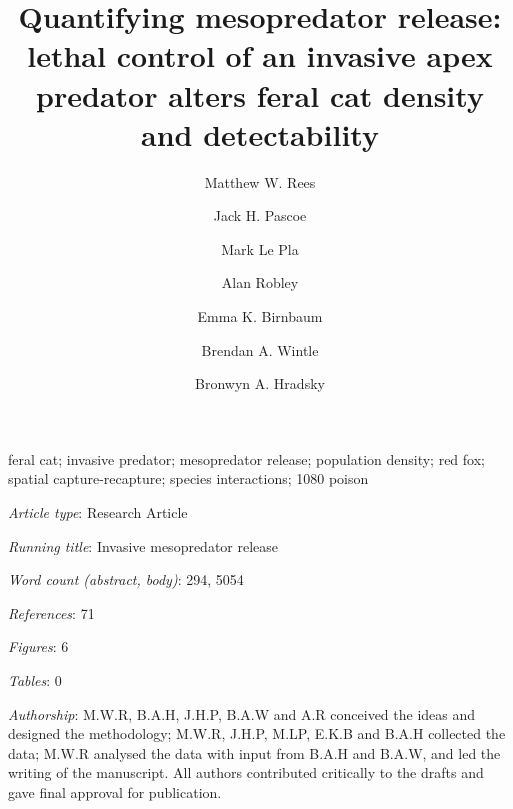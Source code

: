 \documentclass[]{elsarticle} %
\begin{document}
\begin{frontmatter}

  \title{Quantifying mesopredator release: lethal control of an invasive apex predator alters feral cat density and detectability}
    \author[UOM]{Matthew W. Rees}
    \author[CEC]{Jack H. Pascoe}
  
    \author[CEC]{Mark Le Pla}
  
    \author[ARI]{Alan Robley}
  
    \author[CEC]{Emma K. Birnbaum}
  
    \author[UOM]{Brendan A. Wintle}
  
    \author[UOM]{Bronwyn A. Hradsky}
  
      \address[UOM]{Quantitative \& Applied Ecology Group, School of Ecosystem and Forest Science, The University of Melbourne, Parkville, VIC, Australia}
    \address[CEC]{Conservation Ecology Centre, Otway Lighthouse Rd, Cape Otway, VIC, Australia}
    \address[ARI]{Department of Environment, Land, Water and Planning, Arthur Rylah Institute for Environmental Research, Heidelberg, Australia}
  
  \begin{abstract}
  
  \end{abstract}
   \begin{keyword} feral cat; invasive predator; mesopredator release; population density; red fox; spatial capture-recapture; species interactions; 1080 poison\end{keyword}
 \end{frontmatter}

\parskip=12pt

\emph{Article type}: Research Article

\emph{Running title}: Invasive mesopredator release

\emph{Word count (abstract, body)}: 294, 5054

\emph{References}: 71

\emph{Figures}: 6

\emph{Tables}: 0

\emph{Authorship}: M.W.R, B.A.H, J.H.P, B.A.W and A.R conceived the ideas and designed the methodology; M.W.R, J.H.P, M.LP, E.K.B and B.A.H collected the data; M.W.R analysed the data with input from B.A.H and B.A.W, and led the writing of the manuscript. All authors contributed critically to the drafts and gave final approval for publication.
\end{document}
